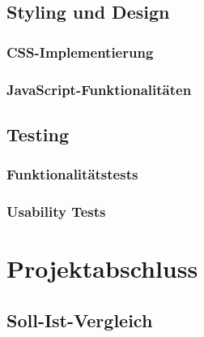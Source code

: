 \documentclass[11pt,a4paper]{article}
\begin{document}

\subsection{Styling und Design}

\subsubsection{CSS-Implementierung}

\subsubsection{JavaScript-Funktionalitäten}

\subsection{Testing}

\subsubsection{Funktionalitätstests}

\subsubsection{Usability Tests}

\newpage
\section{Projektabschluss}

\subsection{Soll-Ist-Vergleich}
\end{document}
